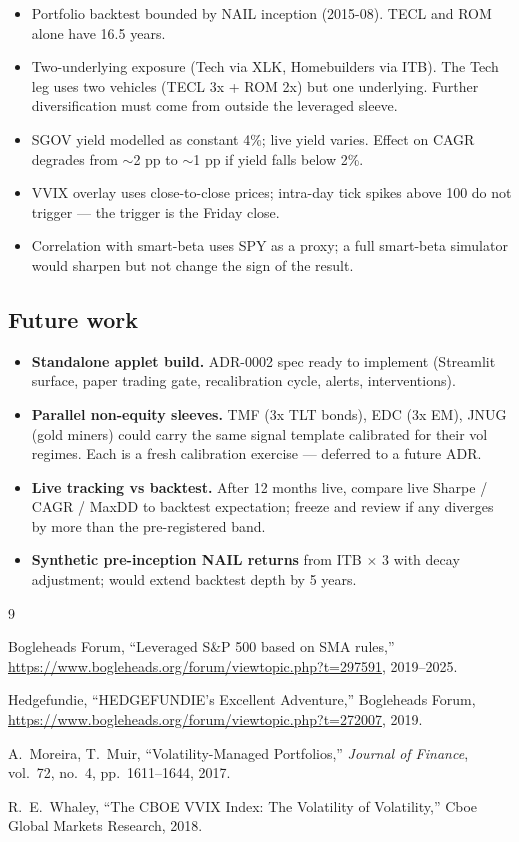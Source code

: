 \documentclass[11pt,a4paper]{article}
\begin{document}
\begin{itemize}[noitemsep]
    \item Portfolio backtest bounded by NAIL inception (2015-08). TECL and ROM alone have 16.5 years.
    \item Two-underlying exposure (Tech via XLK, Homebuilders via ITB). The Tech leg uses two vehicles (TECL 3x + ROM 2x) but one underlying. Further diversification must come from outside the leveraged sleeve.
    \item SGOV yield modelled as constant 4\%; live yield varies. Effect on CAGR degrades from $\sim$2 pp to $\sim$1 pp if yield falls below 2\%.
    \item VVIX overlay uses close-to-close prices; intra-day tick spikes above 100 do not trigger --- the trigger is the Friday close.
    \item Correlation with smart-beta uses SPY as a proxy; a full smart-beta simulator would sharpen but not change the sign of the result.
\end{itemize}

\subsection{Future work}

\begin{itemize}[noitemsep]
    \item \textbf{Standalone applet build.} ADR-0002 spec ready to implement (Streamlit surface, paper trading gate, recalibration cycle, alerts, interventions).
    \item \textbf{Parallel non-equity sleeves.} TMF (3x TLT bonds), EDC (3x EM), JNUG (gold miners) could carry the same signal template calibrated for their vol regimes. Each is a fresh calibration exercise --- deferred to a future ADR.
    \item \textbf{Live tracking vs backtest.} After 12 months live, compare live Sharpe / CAGR / MaxDD to backtest expectation; freeze and review if any diverges by more than the pre-registered band.
    \item \textbf{Synthetic pre-inception NAIL returns} from ITB $\times$ 3 with decay adjustment; would extend backtest depth by 5 years.
\end{itemize}

\begin{thebibliography}{9}

 Bogleheads Forum, ``Leveraged S\&P 500 based on SMA rules,'' \url{https://www.bogleheads.org/forum/viewtopic.php?t=297591}, 2019--2025.

 Hedgefundie, ``HEDGEFUNDIE's Excellent Adventure,'' Bogleheads Forum, \url{https://www.bogleheads.org/forum/viewtopic.php?t=272007}, 2019.

 A.~Moreira, T.~Muir, ``Volatility-Managed Portfolios,'' \textit{Journal of Finance}, vol.~72, no.~4, pp.~1611--1644, 2017.

 R.~E.~Whaley, ``The CBOE VVIX Index: The Volatility of Volatility,'' Cboe Global Markets Research, 2018.

\end{thebibliography}
\end{document}
